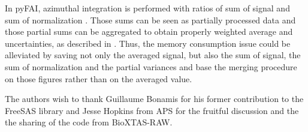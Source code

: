 \documentclass[preprint]{iucr}              %
\begin{document}
In pyFAI, azimuthal integration is performed with ratios of sum of signal and sum of normalization \cite{pyfai_2020}.
Those sums can be seen as partially processed data and those partial sums can be aggregated to obtain properly weighted average and uncertainties, as described in .
Thus, the memory consumption issue could be alleviated by saving not only the averaged signal, but also the sum of signal, the sum of normalization and the partial variances and base the merging procedure on those figures rather than on the averaged value.

The authors wish to thank Guillaume Bonamis for his former contribution to the FreeSAS library and Jesse Hopkins from APS for the fruitful discussion and the the sharing of the code from BioXTAS-RAW.



\end{document}
